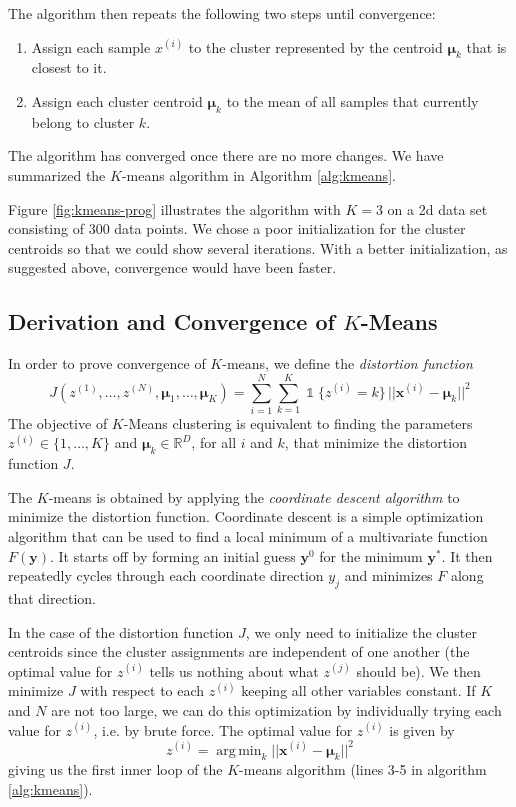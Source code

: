 \documentclass[final,3p,times,twocolumn]{elsarticle}
\DeclareMathOperator*{\argmin}{arg\,min}
\let\bs\boldsymbol
\DeclareMathOperator*{\id}{\mathds{1}}
\begin{document}
The algorithm then repeats the following two steps until convergence:
\begin{enumerate}
\item Assign each sample $x^{(i)}$ to the cluster represented by the centroid $\bs\mu_k$ that is closest to it.
\item Assign each cluster centroid $\bs\mu_k$ to the mean of all samples that currently belong to cluster $k$.
\end{enumerate}
The algorithm has converged once there are no more changes.
We have summarized the $K$-means algorithm in Algorithm \ref{alg:kmeans}.

Figure \ref{fig:kmeans-prog} illustrates the algorithm with $K=3$ on a 2d data set consisting of 300 data points.
We chose a poor initialization for the cluster centroids so that we could show several iterations. 
With a better initialization, as suggested above, convergence would have been faster.



\subsection{Derivation and Convergence of $K$-Means}
\label{sect:kmeans-derivation}
In order to prove convergence of $K$-means, we define the \emph{distortion function} 
\begin{equation}
\label{eqn:distortion}
J(z^{(1)},\dots,z^{(N)},\bs\mu_1,\dots,\bs\mu_K) = \sum_{i=1}^N \sum_{k=1}^K \id\{z^{(i)}=k\}\,||\bs x^{(i)} - \bs \mu_k||^2
\end{equation}
The objective of $K$-Means clustering is equivalent to finding the parameters $z^{(i)} \in \{1,\dots,K\}$ and $\bs\mu_k\in\mathbb{R}^D$, for all $i$ and $k$, that minimize the distortion function $J$.

The $K$-means is obtained by applying the \emph{coordinate descent algorithm} to minimize the distortion function.
Coordinate descent is a simple optimization algorithm that can be used to find a local minimum of a multivariate function $F(\bs y)$.
It starts off by forming an initial guess $\bs y^{0}$ for the minimum $\bs y^*$. 
It then repeatedly cycles through each coordinate direction $y_j$ and minimizes $F$ along that direction.

In the case of the distortion function $J$, we only need to initialize the cluster centroids since the cluster assignments are independent of one another (the optimal value for $z^{(i)}$ tells us nothing about what $z^{(j)}$ should be).
We then minimize $J$ with respect to each $z^{(i)}$ keeping all other variables constant. 
If $K$ and $N$ are not too large, we can do this optimization by individually trying each value for $z^{(i)}$, i.e. by brute force.
The optimal value for $z^{(i)}$ is given by
\begin{equation}
\label{eqn:kmeans-E}
z^{(i)} = \argmin_k ||\bs x^{(i)} - \bs\mu_k||^2
\end{equation}
giving us the first inner loop of the $K$-means algorithm (lines 3-5 in algorithm \ref{alg:kmeans}).
\end{document}
